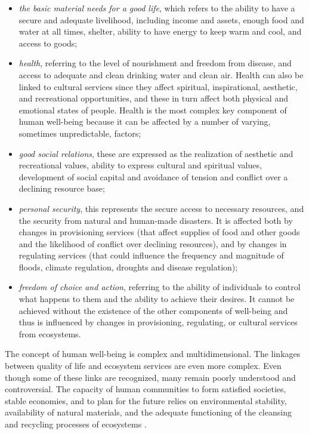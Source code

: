 \documentclass[10pt,a4paper]{article}
\begin{document}
\begin{multicols}{2}
\begin{itemize}
	\item \textit{the basic material needs for a good life}, which refers to the ability to have a secure and adequate livelihood, including income and assets, enough food and water at all times, shelter, ability to have energy to keep warm and cool, and access to goods;
	\item \textit{health}, referring to the level of nourishment and freedom from disease, and access to adequate and clean drinking water and clean air. Health can also be linked to cultural services since they affect spiritual, inspirational, aesthetic, and recreational opportunities, and these in turn affect both physical and emotional states of people. Health is the most complex key component of human well-being because it can be affected by a number of varying, sometimes unpredictable, factors;
	\item \textit{good social relations}, these are expressed as the realization of aesthetic and recreational values, ability to express cultural and spiritual values, development of social capital and avoidance of tension and conflict over a declining resource base;
	\item \textit{personal security}, this represents the secure access to necessary resources, and the security from natural and human-made disasters. It is affected both by changes in provisioning services (that affect supplies of food and other goods and the likelihood of conflict over declining resources), and by changes in regulating services (that could influence the frequency and magnitude of floods, climate regulation, droughts and disease regulation);
	\item \textit{freedom of choice and action}, referring to the ability of individuals to control what happens to them and the ability to achieve their desires. It cannot be achieved without the existence of the other components of well-being and thus is influenced by changes in provisioning, regulating, or cultural services from ecosystems.
\end{itemize}

The concept of human well-being is complex and multidimensional. The linkages between quality of life and ecosystem services are even more complex. Even though some of these links are recognized, many remain poorly understood and controversial. The capacity of human communities to form satisfied societies, stable economies, and to plan for the future relies on environmental stability, availability of natural materials, and the adequate functioning of the cleansing and recycling processes of ecosystems \citep{r26}.


\end{multicols}
\end{document}
